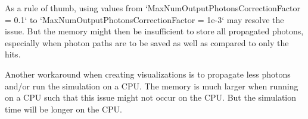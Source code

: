 As a rule of thumb, using values from `MaxNumOutputPhotonsCorrectionFactor = 0.1` to `MaxNumOutputPhotonsCorrectionFactor = 1e-3` may resolve the issue. But the memory might then be insufficient to store all propagated photons, especially when photon paths are to be saved as well as compared to only the hits.

Another workaround when creating visualizations is to propagate less photons and/or run the simulation on a CPU. The memory is much larger when running on a CPU such that this issue might not occur on the CPU. But the simulation time will be longer on the CPU.


